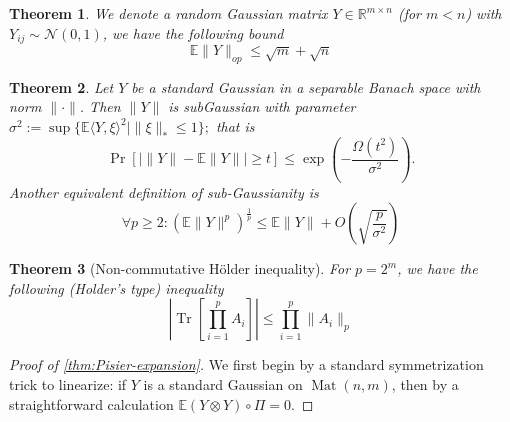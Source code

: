 \documentclass[aos]{imsart}
\newtheorem{theorem}{Theorem}
\theoremstyle{definition}
\DeclareMathOperator{\mat}{Mat}
\DeclareMathOperator{\tr}{Tr}
\newcommand{\R}{{\mathbb{R}}}
\newcommand{\E}{\mathbb{E}}
\begin{document}
\begin{appendix}
\begin{theorem} \cite{P86}
We denote a random Gaussian matrix $Y \in \R^{m \times n}$ (for $m < n$) with $Y_{ij} \sim \mathcal{N}(0,1)$, we have the following bound
\[ \E \|Y\|_{op} \leq \sqrt{m} + \sqrt{n} \]
\end{theorem}


\begin{theorem} \cite{P86}
Let $Y$ be a standard Gaussian in a separable Banach space with norm $\|\cdot\|$. Then $\|Y\|$ is subGaussian with parameter $\sigma^{2} := \sup \{ \E \langle Y, \xi \rangle^{2} \mid \|\xi\|_{*} \leq 1 \}; $ that is
\[ \Pr [ | \|Y\| - \E \|Y\| | \geq t ] \leq \exp \left( - \frac{\Omega(t^{2})}{\sigma^{2}} \right).   \]
Another equivalent definition of sub-Gaussianity is
\[ \forall p \geq 2: (\E \|Y\|^{p})^{\frac{1}{p}} \leq \E \|Y\| + O \left( \sqrt{\frac{p}{\sigma^{2}}} \right)   \]
\end{theorem}

\begin{theorem}[Non-commutative H\"older inequality]\label{thm:holder}
For $p = 2^{m}$, we have the following (Holder's type) inequality
\[ |\tr[\prod_{i=1}^{p} A_{i}]| \leq \prod_{i=1}^{p} \|A_{i}\|_{p}   \]
\end{theorem}



\begin{proof} [Proof of \cref{thm:Pisier-expansion}]
We first begin by a standard symmetrization trick to linearize: if $Y$ is a standard Gaussian on $\mat(n,m)$, then by a straightforward calculation $\E (Y \otimes Y)\circ \Pi = 0$.


\end{proof}
\end{appendix}
\end{document}
